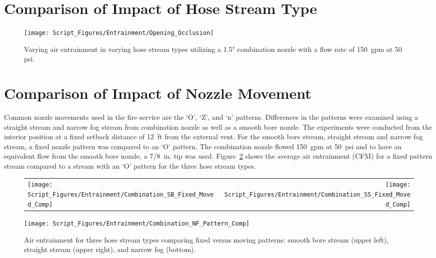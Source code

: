 \documentclass[12pt,oneside]{book}
\begin{document}
\section{Comparison of Impact of Hose Stream Type}

\begin{figure}[!ht]
	\centering
	\texttt{[image: Script\_Figures/Entrainment/Opening\_Occlusion]}
	\caption{Varying air entrainment in varying hose stream types utilizing a 1.5" combination nozzle with a flow rate of 150~gpm at 50 psi.}
	\label{fig:Opening_Occlusion}
\end{figure}


\section{Comparison of Impact of Nozzle Movement}
\label{sec:movement}

Common nozzle movements used in the fire service are the `O', `Z', and `n' patterns. Differences in the patterns were examined using a straight stream and narrow fog stream from combination nozzle as well as a smooth bore nozzle. The experiments were conducted from the interior position at a fixed setback distance of 12~ft from the external vent. For the smooth bore stream, straight stream and narrow fog stream, a fixed nozzle pattern was compared to an `O' pattern. The combination nozzle flowed 150~gpm at 50~psi and to have an equivalent flow from the smooth bore nozzle, a 7/8~in. tip was used. Figure~\ref{fig:SB_SS_NF_Movement_Comparison} shows the average air entrainment (CFM) for a fixed pattern stream compared to a stream with an `O' pattern for the three hose stream types.

\begin{figure}[!ht]
\begin{tabular*}{\textwidth}{lr}
\texttt{[image: Script\_Figures/Entrainment/Combination\_SB\_Fixed\_Moved\_Comp]} &
\texttt{[image: Script\_Figures/Entrainment/Combination\_SS\_Fixed\_Moved\_Comp]} \\
\end{tabular*}
\centering
\texttt{[image: Script\_Figures/Entrainment/Combination\_NF\_Pattern\_Comp]} \\
\caption[Air Entrainment Comparison of Fixed Versus Moving Patterns]{Air entrainment for three hose stream types comparing fixed versus moving patterns: smooth bore stream (upper left), straight stream (upper right), and narrow fog (bottom).}
\label{fig:SB_SS_NF_Movement_Comparison}
\end{figure}
\end{document}
